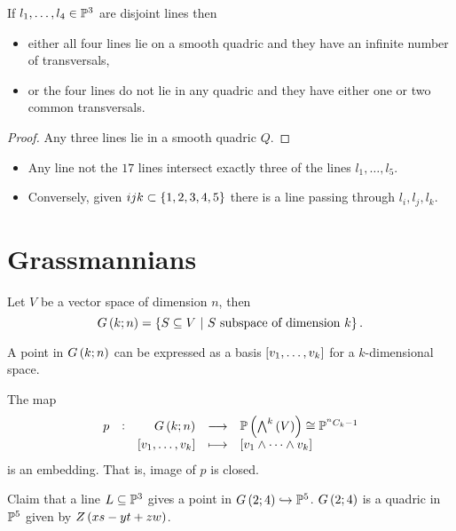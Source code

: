\begin{lemma}
If $ l_1, \dots, l_4 \in \mathbb{P}^3 $ are disjoint lines then
\begin{itemize}
\item either all four lines lie on a smooth quadric and they have an infinite number of transversals,
\item or the four lines do not lie in any quadric and they have either one or two common transversals.
\end{itemize}
\end{lemma}

\begin{proof}
Any three lines lie in a smooth quadric $ Q $.
\end{proof}

\begin{lemma}
\hfill
\begin{itemize}
\item Any line not the $ 17 $ lines intersect exactly three of the lines $ l_1, \dots, l_5 $.
\item Conversely, given $ ijk \subset \cbr{1, 2, 3, 4, 5} $ there is a line passing through $ l_i, l_j, l_k $.
\end{itemize}
\end{lemma}

\pagebreak

\section{Grassmannians}


\begin{definition}
Let $ V $ be a vector space of dimension $ n $, then
$$ G\br{k; n} = \cbr{S \subseteq V \st S \ \text{subspace of dimension} \ k}. $$
\end{definition}

\begin{remark}
A point in $ G\br{k; n} $ can be expressed as a basis $ \sbr{v_1, \dots, v_k} $ for a $ k $-dimensional space.
\end{remark}

\begin{theorem}
The map
$$ \function[p]{G\br{k; n}}{\PP\br{\bigwedge^k\br{V}} \cong \PP^{^nC_k - 1}}{\sbr{v_1, \dots, v_k}}{\sbr{v_1 \wedge \dots \wedge v_k}} $$
is an embedding. That is, image of $ p $ is closed.
\end{theorem}

\begin{example}
Claim that a line $ L \subseteq \mathbb{P}^3 $ gives a point in $ G\br{2; 4} \hookrightarrow \PP^5 $. $ G\br{2; 4} $ is a quadric in $ \mathbb{P}^5 $ given by $ Z\br{xs - yt + zw} $.
\end{example}

